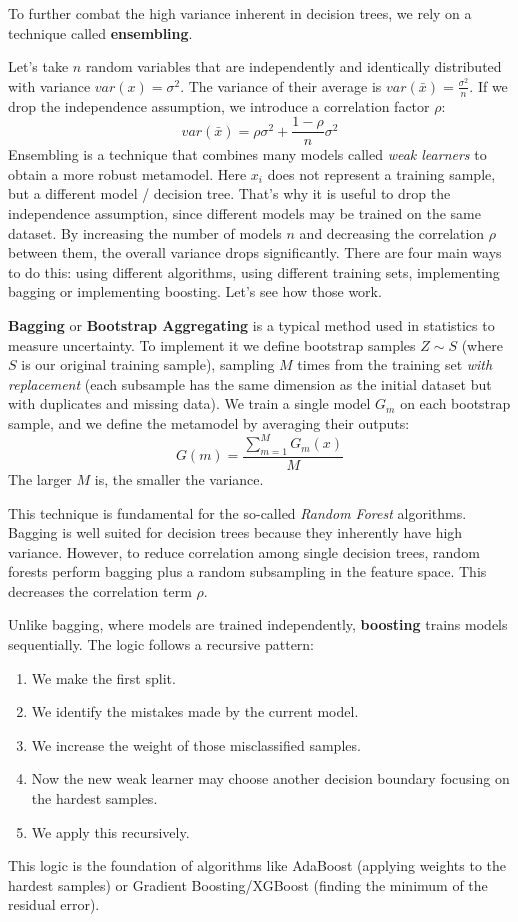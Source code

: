 To further combat the high variance inherent in decision trees, we rely on a technique called \textbf{ensembling}. 

Let's take $n$ random variables that are independently and identically distributed with variance $var(x)=\sigma^2$. The variance of their average is $var(\bar{x}) = \frac{\sigma^2}{n}$. If we drop the independence assumption, we introduce a correlation factor $\rho$:
\begin{equation}
    var(\bar{x}) = \rho\sigma^2 + \frac{1-\rho}{n}\sigma^2
\end{equation}
Ensembling is a technique that combines many models called \textit{weak learners} to obtain a more robust metamodel. Here $x_i$ does not represent a training sample, but a different model / decision tree. That's why it is useful to drop the independence assumption, since different models may be trained on the same dataset. By increasing the number of models $n$ and decreasing the correlation $\rho$ between them, the overall variance drops significantly. There are four main ways to do this: using different algorithms, using different training sets, implementing bagging or implementing boosting. Let's see how those work.

\textbf{Bagging} or \textbf{Bootstrap Aggregating} is a typical method used in statistics to measure uncertainty. To implement it we define bootstrap samples $Z \sim S$ (where $S$ is our original training sample), sampling $M$ times from the training set \textit{with replacement} (each subsample has the same dimension as the initial dataset but with duplicates and missing data). We train a single model $G_m$ on each bootstrap sample, and we define the metamodel by averaging their outputs:
\begin{equation*}
   G(m) = \frac{\sum_{m=1}^M G_m(x)}{M}
\end{equation*}
The larger $M$ is, the smaller the variance. 

This technique is fundamental for the so-called \textit{Random Forest} algorithms. Bagging is well suited for decision trees because they inherently have high variance. However, to reduce correlation among single decision trees, random forests perform bagging plus a random subsampling in the feature space. This decreases the correlation term $\rho$.

Unlike bagging, where models are trained independently, \textbf{boosting} trains models sequentially. The logic follows a recursive pattern:
\begin{enumerate}
    \item We make the first split.
    \item We identify the mistakes made by the current model.
    \item We increase the weight of those misclassified samples.
    \item Now the new weak learner may choose another decision boundary focusing on the hardest samples.
    \item We apply this recursively.
\end{enumerate}
This logic is the foundation of algorithms like AdaBoost (applying weights to the hardest samples) or Gradient Boosting/XGBoost (finding the minimum of the residual error).


